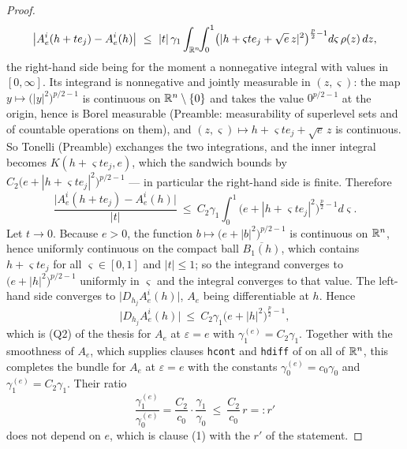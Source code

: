 \begin{proof}
\[
\bigl|A_e^i(h+te_j)-A_e^i(h)\bigr|
\ \le\ |t|\,\gamma_1\int_{\mathbb{R}^n}\!\!\int_0^1
\bigl(|h+\varsigma te_j+\sqrt e\,z|^2\bigr)^{\frac p2-1}d\varsigma\,\rho(z)\,dz ,
\]
the right-hand side being for the moment a nonnegative integral with values in
$[0,\infty]$.  Its integrand is nonnegative and jointly measurable in
$(z,\varsigma)$: the map $y\mapsto\bigl(|y|^2\bigr)^{p/2-1}$ is continuous on
$\mathbb{R}^n\setminus\{0\}$ and takes the value $0^{p/2-1}$ at the origin, hence is
Borel measurable (Preamble: measurability of superlevel sets and of countable
operations on them), and $(z,\varsigma)\mapsto h+\varsigma te_j+\sqrt e\,z$ is
continuous.  So Tonelli (Preamble) exchanges the two integrations, and the inner
integral becomes $K(h+\varsigma te_j,e)$, which the sandwich bounds by
$C_2\bigl(e+|h+\varsigma te_j|^2\bigr)^{p/2-1}$ --- in particular the
right-hand side is finite.  Therefore
\[
\frac{\bigl|A_e^i(h+te_j)-A_e^i(h)\bigr|}{|t|}
\ \le\ C_2\gamma_1\int_0^1\bigl(e+|h+\varsigma te_j|^2\bigr)^{\frac p2-1}d\varsigma .
\]
Let $t\to0$.  Because $e>0$, the function
$b\mapsto\bigl(e+|b|^2\bigr)^{p/2-1}$ is continuous on $\mathbb{R}^n$, hence uniformly
continuous on the compact ball $\overline{B_1(h)}$, which contains
$h+\varsigma te_j$ for all $\varsigma\in[0,1]$ and $|t|\le1$; so the integrand
converges to $\bigl(e+|h|^2\bigr)^{p/2-1}$ uniformly in $\varsigma$ and the
integral converges to that value.  The left-hand side converges to
$\bigl|D_{h_j}A_e^i(h)\bigr|$, $A_e$ being differentiable at $h$.  Hence
\[
\bigl|D_{h_j}A_e^i(h)\bigr|
\ \le\ C_2\gamma_1\bigl(e+|h|^2\bigr)^{\frac p2-1},
\]
which is (Q2) of the thesis for $A_e$ at $\varepsilon=e$ with
$\gamma_1^{(e)}=C_2\gamma_1$.  Together with the smoothness of $A_e$, which
supplies clauses \texttt{hcont} and \texttt{hdiff} of
 on all of $\mathbb{R}^n$, this completes the bundle for
$A_e$ at $\varepsilon=e$ with the constants
$\gamma_0^{(e)}=c_0\gamma_0$ and $\gamma_1^{(e)}=C_2\gamma_1$.  Their ratio
\[
\frac{\gamma_1^{(e)}}{\gamma_0^{(e)}}
=\frac{C_2}{c_0}\cdot\frac{\gamma_1}{\gamma_0}\ \le\ \frac{C_2}{c_0}\,r=:r'
\]
does not depend on $e$, which is clause (1) with the $r'$ of the statement.


\end{proof}
